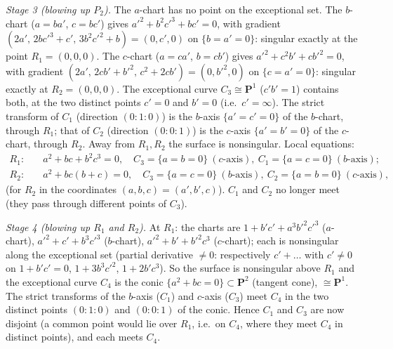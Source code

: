 \documentclass[11pt]{article}
\begin{document}
\emph{Stage 3 (blowing up $P_2$).} The $a$-chart has no point on the exceptional set. The $b$-chart ($a=ba'$, $c=bc'$) gives $a'^2+b^2c'^3+bc'=0$, with gradient $(2a',\,2bc'^3+c',\,3b^2c'^2+b)=(0,c',0)$ on $\{b=a'=0\}$: singular exactly at the point $R_1=(0,0,0)$. The $c$-chart ($a=ca'$, $b=cb'$) gives $a'^2+c^2b'+cb'^2=0$, with gradient $(2a',\,2cb'+b'^2,\,c^2+2cb')=(0,b'^2,0)$ on $\{c=a'=0\}$: singular exactly at $R_2=(0,0,0)$. The exceptional curve $C_3\cong\mathbf P^1$ ($c'b'=1$) contains both, at the two distinct points $c'=0$ and $b'=0$ (i.e.\ $c'=\infty$). The strict transform of $C_1$ (direction $(0:1:0)$) is the $b$-axis $\{a'=c'=0\}$ of the $b$-chart, through $R_1$; that of $C_2$ (direction $(0:0:1)$) is the $c$-axis $\{a'=b'=0\}$ of the $c$-chart, through $R_2$. Away from $R_1,R_2$ the surface is nonsingular. Local equations:
\begin{align*}
R_1:&\quad a^2+bc+b^2c^3=0,\quad C_3=\{a=b=0\}\ (c\text{-axis}),\ C_1=\{a=c=0\}\ (b\text{-axis});\\
R_2:&\quad a^2+bc(b+c)=0,\quad C_3=\{a=c=0\}\ (b\text{-axis}),\ C_2=\{a=b=0\}\ (c\text{-axis}),
\end{align*}
(for $R_2$ in the coordinates $(a,b,c)=(a',b',c)$). $C_1$ and $C_2$ no longer meet (they pass through different points of $C_3$).

\emph{Stage 4 (blowing up $R_1$ and $R_2$).} At $R_1$: the charts are $1+b'c'+a^3b'^2c'^3$ ($a$-chart), $a'^2+c'+b^3c'^3$ ($b$-chart), $a'^2+b'+b'^2c^3$ ($c$-chart); each is nonsingular along the exceptional set (partial derivative $\ne0$: respectively $c'+\dots$ with $c'\ne0$ on $1+b'c'=0$, $1+3b^3c'^2$, $1+2b'c^3$). So the surface is nonsingular above $R_1$ and the exceptional curve $C_4$ is the conic $\{a^2+bc=0\}\subset\mathbf P^2$ (tangent cone), $\cong\mathbf P^1$. The strict transforms of the $b$-axis ($C_1$) and $c$-axis ($C_3$) meet $C_4$ in the two distinct points $(0:1:0)$ and $(0:0:1)$ of the conic. Hence $C_1$ and $C_3$ are now disjoint (a common point would lie over $R_1$, i.e.\ on $C_4$, where they meet $C_4$ in distinct points), and each meets $C_4$.
\end{document}
